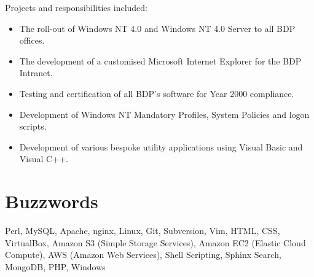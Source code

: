 \documentclass[10pt]{article}
\begin{document}
Projects and responsibilities included:

\begin{itemize}
    \item The roll-out of Windows NT 4.0 and Windows NT 4.0 Server to all BDP offices.
    \item The development of a customised Microsoft Internet Explorer for the BDP
          Intranet.
    \item Testing and certification of all BDP's software for Year 2000 compliance.
    \item Development of Windows NT Mandatory Profiles, System Policies and logon
          scripts.
    \item Development of various bespoke utility applications using Visual Basic and
          Visual C++.
\end{itemize}

\section{Buzzwords}

Perl, MySQL, Apache, nginx, Linux, Git, Subversion, Vim, HTML, CSS,
VirtualBox, Amazon S3 (Simple Storage Services), Amazon EC2 (Elastic Cloud
Compute), AWS (Amazon Web Services), Shell Scripting, Sphinx Search, MongoDB,
PHP, Windows
\end{document}
